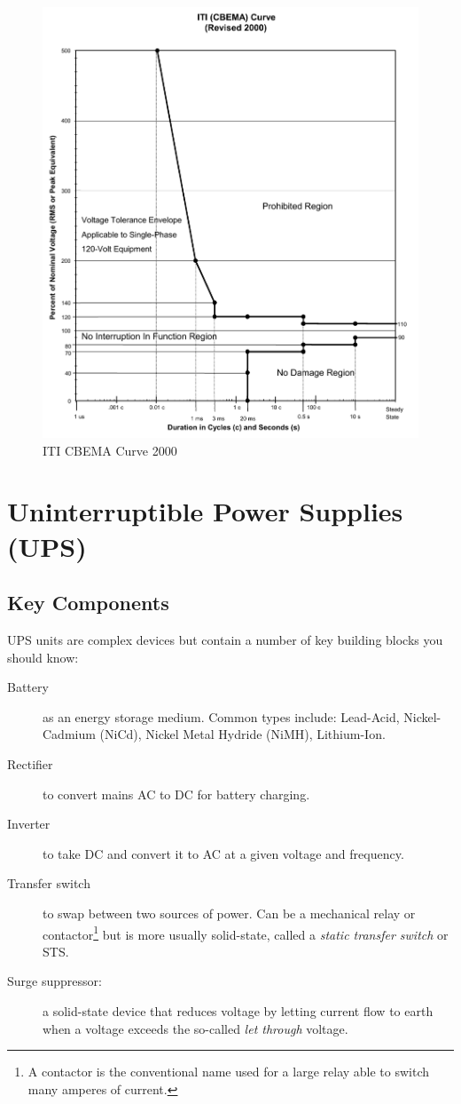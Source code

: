 \documentclass{pgnotes}
\begin{document}
\begin{figure}[htbp]
  \centering
  \includegraphics[width=0.9\linewidth]{iti_cbema_curve}
  \caption{ITI CBEMA Curve 2000}
  \label{fig:itic-cbema-curve}
\end{figure}

\newpage

\section{Uninterruptible Power Supplies (UPS)}

\subsection{Key Components}
UPS units are complex devices but contain a number of key building blocks you should know: 
\begin{description}
\item[Battery] as an energy storage medium.
  Common types include: Lead-Acid, Nickel-Cadmium (NiCd), Nickel Metal Hydride (NiMH), Lithium-Ion. 
\item[Rectifier] to convert mains AC to DC for battery charging.
\item[Inverter] to take DC and convert it to AC at a given voltage and frequency.
\item[Transfer switch] to swap between two sources of power. Can be a mechanical relay or contactor\footnote{A contactor is the conventional name used for a large relay able to switch many amperes of current.} but is more usually solid-state, called a \textit{static transfer switch} or STS.
\item[Surge suppressor:] a solid-state device that reduces voltage by letting current flow to earth when a voltage exceeds the so-called \textit{let through} voltage.
\end{description}
\end{document}
